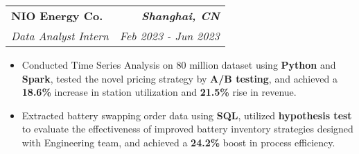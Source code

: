 \documentclass[10pt]{exam}
\makeatletter
\newcommand{\ResumeItem}[1]{
  \item\small{
    {#1 \vspace{-1pt}}
  }
}
\newcommand{\ResumeSubheadingBNII}[4]{
  \vspace{-2pt}\item
    \begin{tabular*}{\textwidth}[t]{l@{\extracolsep{\fill}}r}
      \textbf{#1} & \textbf{\textit{#2}} \\
      \textit{#3} & \textit{ #4} \\
    \end{tabular*}\vspace{-7pt}
}
\newcommand{\ResumeSubheadingBNIII}[2]{
  \vspace{-2pt}\item
    \begin{tabular*}{\textwidth}[t]{l@{\extracolsep{\fill}}r}
      #1 & #2 \\
    \end{tabular*}\vspace{-7pt}
}
\newcommand{\ResumeItemListStart}{\begin{itemize}}
\newcommand{\ResumeItemListEnd}{\end{itemize}\vspace{-5pt}}
\makeatother
\begin{document}
\ResumeSubheadingBNII
{NIO Energy Co.}
{Shanghai, CN}
{Data Analyst Intern}
{Feb 2023 - Jun 2023}
\ResumeItemListStart
\ResumeItem{
    Conducted Time Series Analysis on 80 million dataset using \textbf{Python} and \textbf{Spark}, tested the novel pricing strategy by \textbf{A/B testing}, and achieved a \textbf{18.6\%} increase in station utilization and \textbf{21.5\%} rise in revenue.
}
\ResumeItem{
    Extracted battery swapping order data using \textbf{SQL}, utilized \textbf{hypothesis test} to evaluate the effectiveness of improved battery inventory strategies designed with Engineering team, and achieved a \textbf{24.2\%} boost in process efficiency.
}
\ResumeItemListEnd




\end{document}
